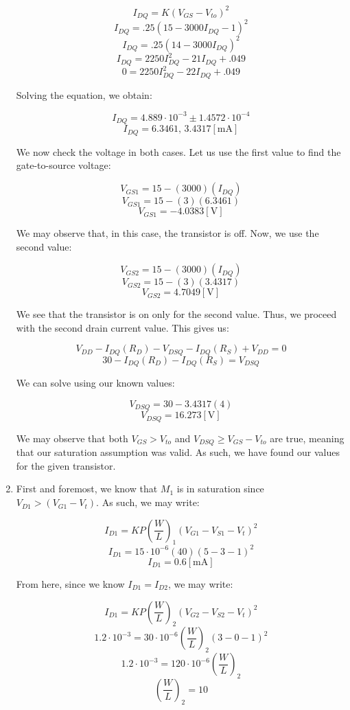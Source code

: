 \begin{enumerate}
    $$I_{DQ}=K(V_{GS}-V_{to})^2$$
    $$I_{DQ}=.25(15-3000I_{DQ}-1)^2$$
    $$I_{DQ}=.25(14-3000I_{DQ})^2$$
    $$I_{DQ}=2250I_{DQ}^2-21I_{DQ}+.049$$
    $$0=2250I_{DQ}^2-22I_{DQ}+.049$$

    Solving the equation, we obtain:

    $$I_{DQ}=4.889\cdot10^{-3}\pm1.4572\cdot10^{-4}$$
    $$\boxed{I_{DQ}=6.3461,\,3.4317[\si{\milli\ampere}]}$$

    We now check the voltage in both cases. Let us use the first value to find the gate-to-source voltage:

    $$V_{GS1}=15-(3000)(I_{DQ})$$
    $$V_{GS1}=15-(3)(6.3461)$$
    $$\boxed{V_{GS1}=-4.0383[\si{\volt}]}$$

    We may observe that, in this case, the transistor is off. Now, we use the second value:

    $$V_{GS2}=15-(3000)(I_{DQ})$$
    $$V_{GS2}=15-(3)(3.4317)$$
    $$\boxed{V_{GS2}=4.7049[\si{\volt}]}$$

    We see that the transistor is on only for the second value. Thus, we proceed with the second drain current value. This gives us:

    $$V_{DD}-I_{DQ}(R_D)-V_{DSQ}-I_{DQ}(R_S)+V_{DD}=0$$
    $$30-I_{DQ}(R_D)-I_{DQ}(R_S)=V_{DSQ}$$

    We can solve using our known values:

    $$V_{DSQ}=30-3.4317(4)$$
    $$\boxed{V_{DSQ}=16.273[\si{\volt}]}$$

    We may observe that both $V_{GS}>V_{to}$ and $V_{DSQ}\geq V_{GS}-V_{to}$ are true, meaning that our saturation assumption was valid. As such, we have found our values for the given transistor.

  \item First and foremost, we know that $M_1$ is in saturation since $V_{D1}>(V_{G1}-V_t)$. As such, we may write:

    $$I_{D1}=KP\left( \frac{W}{L} \right)_1\left( V_{G1}-V_{S1}-V_t \right)^2$$
    $$I_{D1}=15\cdot10^{-6}\left( 40 \right)\left( 5-3-1 \right)^2$$
    $$\boxed{I_{D1}=0.6[\si{\milli\ampere}]}$$

    From here, since we know $I_{D1}=I_{D2}$, we may write:

    $$I_{D1}=KP\left( \frac{W}{L} \right)_2(V_{G2}-V_{S2}-V_t)^2$$
    $$1.2\cdot10^{-3}=30\cdot10^{-6}\left( \frac{W}{L} \right)_2(3-0-1)^2$$
    $$1.2\cdot10^{-3}=120\cdot10^{-6}\left( \frac{W}{L} \right)_2$$
    $$\boxed{\left( \frac{W}{L} \right)_2=10}$$

\end{enumerate}



